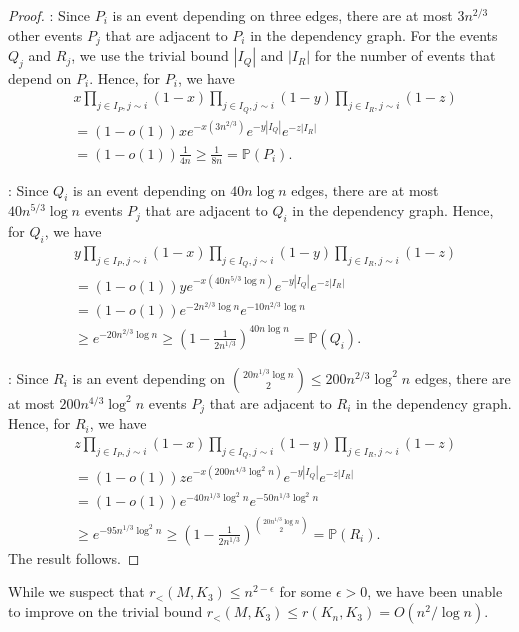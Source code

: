 \documentclass[11pt]{article}
\begin{document}
\begin{proof}
 : 
Since $P_i$ is an event depending on three edges, there are at most 
$3n^{2/3}$ other events $P_j$ that are adjacent to $P_i$ in the dependency graph.
For the events $Q_j$ and $R_j$, we use the trivial bound $|I_Q|$ and $|I_R|$ for
the number of events that depend on $P_i$. Hence, for $P_{i}$, we have
\begin{align*}
 & x\prod_{j\in I_{P},j\sim i}(1-x)\prod_{j\in I_{Q},j\sim i}(1-y)\prod_{j\in I_{R},j\sim i}(1-z)\\
 & = (1-o(1)) xe^{-x(3n^{2/3})}e^{-y|I_{Q}|}e^{-z|I_{R}|}\\
 & =(1-o(1))\frac{1}{4n} \ge \frac{1}{8n} = \mathbb{P}(P_{i}).
\end{align*}

 : 
Since $Q_i$ is an event depending on $40n\log n$ edges, there are at most 
$40n^{5/3}\log n$ events $P_j$ that are adjacent to $Q_i$ in the dependency graph.
Hence, for $Q_{i}$, we have
\begin{align*}
 &  y\prod_{j\in I_{P},j\sim i}(1-x)\prod_{j\in I_{Q},j\sim i}(1-y)\prod_{j\in I_{R},j\sim i}(1-z)\\
 & = (1-o(1)) ye^{-x(40n^{5/3}\log n)}e^{-y|I_{Q}|}e^{-z|I_{R}|}\\
 & = (1-o(1))e^{-2n^{2/3}\log n}e^{-10n^{2/3}\log n}\\
 & \ge e^{-20n^{2/3}\log n} \geq \left(1-\frac{1}{2n^{1/3}}\right)^{40n\log n} = \mathbb{P}(Q_{i}).
\end{align*}

 : 
Since $R_i$ is an event depending on ${20n^{1/3}\log n \choose 2} \le 200n^{2/3}\log^2 n$ edges, there are at most $200n^{4/3}\log^2 n$ events $P_j$ that are adjacent to $R_i$ in the dependency graph. Hence, for $R_{i}$, we have
\begin{align*}
 &  z\prod_{j\in I_{P},j\sim i}(1-x)\prod_{j\in I_{Q},j\sim i}(1-y)\prod_{j\in I_{R},j\sim i}(1-z)\\
 & = (1-o(1)) ze^{-x(200n^{4/3}\log^{2}n)}e^{-y|I_{Q}|}e^{-z|I_{R}|}\\
 & = (1-o(1)) e^{-40n^{1/3}\log^{2}n} e^{-50n^{1/3}\log^{2}n}\\
 & \ge e^{-95n^{1/3}\log^{2}n} \ge \left(1-\frac{1}{2n^{1/3}}\right)^{\binom{20n^{1/3}\log n}{2}} = \mathbb{P}(R_{i}).
\end{align*}
The result follows.
\end{proof}

While we suspect that $r_{<}(M, K_3)\le n^{2-\epsilon}$ for some $\epsilon > 0$, we have been unable to improve on the trivial bound $r_<(M, K_3) \leq r(K_n, K_3) = O(n^2/\log n)$.
\end{document}
